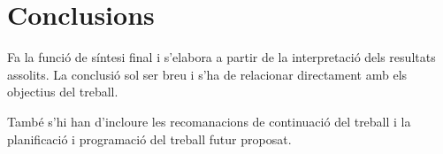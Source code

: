 \chapter{Conclusions}

Fa la funció de síntesi final i s’elabora a partir de la interpretació dels resultats assolits. La conclusió sol ser breu i s’ha de relacionar directament amb els objectius del treball. 

També s’hi han d’incloure les recomanacions de continuació del treball i la planificació i programació del treball futur proposat.
